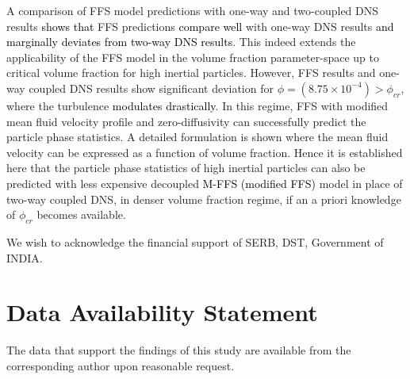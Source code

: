\documentclass[notitlepage]{revtex4-1}
\begin{document}
A comparison of FFS model predictions with one-way and two-coupled DNS results \textcolor{black}{shows that} FFS predictions \textcolor{black}{compare well} with one-way DNS results \textcolor{black}{and marginally deviates from two-way DNS results}. This indeed extends the applicability of the FFS model in the volume fraction parameter-space up to critical volume fraction for high inertial particles. However, FFS results and one-way coupled DNS results show significant deviation for $\phi=(8.75\times10^{-4})>\phi_{cr}$, where the turbulence \textcolor{black}{modulates drastically}. In this regime, FFS with modified mean fluid velocity profile and zero-diffusivity can successfully predict the particle phase statistics. A detailed formulation is shown where the mean fluid velocity can be expressed as a function of volume fraction. Hence it is established here that the particle phase statistics of high inertial particles can also be predicted with less expensive decoupled \textcolor{black}{M-FFS (modified FFS)} model in place of two-way coupled DNS, in denser volume fraction regime, if an a priori knowledge of $\phi_{cr}$ becomes available.    
 

		\begin{acknowledgments}
				We wish to acknowledge the financial support of SERB, DST, Government of INDIA.
			\end{acknowledgments}
		
		\section*{Data Availability Statement}
		The data that support the findings of this study are available
		from the corresponding author upon reasonable request.



	
\end{document}

